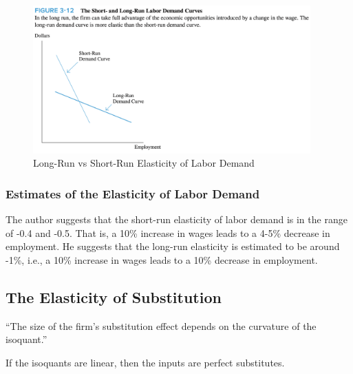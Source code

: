 \FloatBarrier

\begin{figure}[!htb]
    \centering
        \includegraphics[width=0.95\textwidth]{../input/ch_3p4_long_v_short_run.png}
    \caption{Long-Run vs Short-Run Elasticity of Labor Demand}
    \label{fig:ch_3p4_long_v_short_run}
\end{figure}

\FloatBarrier

\subsubsection{Estimates of the Elasticity of Labor Demand}

The author suggests that the short-run 
elasticity of labor demand is in the range of 
-0.4 and -0.5. That is, a 10\% increase in wages
leads to a 4-5\% decrease in employment. 
He suggests that the long-run elasticity
is estimated to be around -1\%, i.e.,
a 10\% increase in wages leads to a 10\% decrease in employment.



\subsection{The Elasticity of Substitution}


``The size of the firm's substitution effect depends on the curvature of the isoquant.''

\begin{definition}
    
    If the isoquants are linear, 
    then the inputs are perfect substitutes.

\end{definition}

